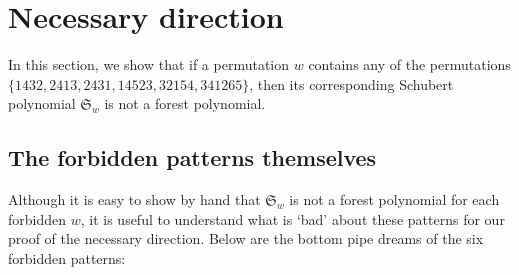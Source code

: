 \documentclass{article}
\theoremstyle{definition} %
\begin{document}
\section{Necessary direction}
In this section, we show that if a permutation $w$ contains any of the permutations $\{1432, 2413, 2431, 14523, 32154, 341265\}$, then its corresponding Schubert polynomial $\mathfrak{S}_w$ is not a forest polynomial.

\subsection{The forbidden patterns themselves}

Although it is easy to show by hand that $\mathfrak{S}_w$ is not a forest polynomial for each forbidden $w$, it is useful to understand what is `bad' about these patterns for our proof of the necessary direction. Below are the bottom pipe dreams of the six forbidden patterns:
\end{document}
